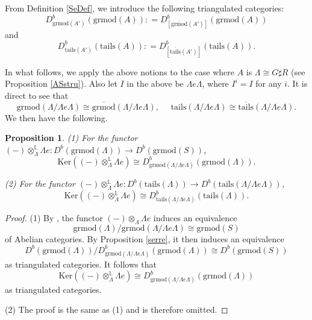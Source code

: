 \documentclass[11pt,reqno]{amsart}
\newtheorem{proposition}[theorem]{Proposition}
\theoremstyle{definition}
\begin{document}
From Definition \ref{SeDef}, we introduce the following triangulated categories:
$$
D^{b}_{\mathrm{grmod}(A')}(\mathrm{grmod}(A)) 
: = D^{b}_{[\overline{\mathrm{grmod}}(A')]}(\mathrm{grmod}(A)) 
$$
and 
$$
D^{b}_{\mathrm{tails}(A')}(\mathrm{tails}(A)) 
: = D^{b}_{[\overline{\mathrm{tails}}(A')]}(\mathrm{tails}(A)).
$$

In what follows, we apply the above
notions to the case where $A$
is $\Lambda\cong G\sharp R$
(see Proposition \ref{ASstru}).
Also let $I$ in the above be $\Lambda e\Lambda$, where 
$I^i = I$ for any $i$. It is direct to see that 
$$
\mathrm{grmod}(\Lambda / \Lambda e \Lambda) 
\cong \overline{\mathrm{grmod}}(\Lambda / \Lambda e \Lambda), \,\, \quad 
\mathrm{tails}(\Lambda / \Lambda e \Lambda) 
\cong  \overline{\mathrm{tails}}(\Lambda / \Lambda e \Lambda).
$$ 
We then
have the following. 

\begin{proposition}\label{Ker1}
\textup{(1)}
For the functor 
$(-) \otimes^{\mathbb{L}}_{\Lambda} \Lambda e: 
D^{b}(\mathrm{grmod}(\Lambda)) \rightarrow D^{b}(\mathrm{grmod}(S))
$, 
$$
\mathrm{Ker}((-) \otimes^{\mathbb{L}}_{\Lambda} \Lambda e) 
\cong D^{b}_{\mathrm{grmod}(\Lambda / \Lambda e \Lambda)}(\mathrm{grmod}(\Lambda)).
$$

\textup{(2)}
For the functor 
$
(-) \otimes^{\mathbb{L}}_{\Lambda} \Lambda e: D^{b}(\mathrm{tails}
(\Lambda)) \rightarrow D^{b}(\mathrm{tails}(\Lambda / \Lambda e \Lambda)) 
$, 
$$
\mathrm{Ker}((-) \otimes^{\mathbb{L}}_{\Lambda} \Lambda e )
 \cong D^{b}_{\mathrm{tails}(\Lambda / \Lambda e \Lambda)}(\mathrm{tails}(\Lambda)).
$$
\end{proposition}

\begin{proof}
(1) By \cite[Proposition 5.9]{MJI}, 
the functor $(-) \otimes_{\Lambda} \Lambda e$
induces an equivalence
$$
\mathrm{grmod}(\Lambda ) / \mathrm{grmod}(\Lambda / \Lambda e \Lambda) \cong \mathrm{grmod}(S)
$$
of Abelian categories. 
By Proposition \ref{serre}, 
it then induces an equivalence
$$
D^{b}(\mathrm{grmod}(\Lambda)) / D^{b}_{\mathrm{grmod}(\Lambda / \Lambda e \Lambda)}
(\mathrm{grmod}(\Lambda)) \cong D^{b}(\mathrm{grmod}(S))
$$
as triangulated categories.
It follows that 
$$
\mathrm{Ker}((-) \otimes^{\mathbb{L}}_{\Lambda} \Lambda e) 
\cong D^{b}_{\mathrm{grmod}(\Lambda / \Lambda e \Lambda)}(\mathrm{grmod}(\Lambda))
$$
as triangulated categories.

(2) The proof is the same as (1)
and is therefore omitted.
\end{proof}
\end{document}
